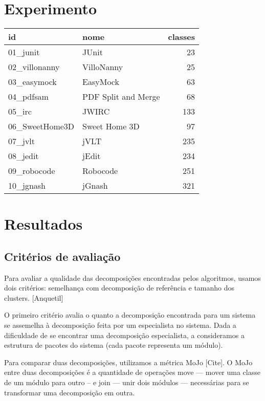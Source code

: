 
\section{Experimento}


\centering
\begin{tabular}{l l r}
\hline
id & nome & classes \\
\hline 
01\_junit       & JUnit               & 23  \\
02\_villonanny  & VilloNanny          & 25  \\
03\_easymock    & EasyMock            & 63  \\
04\_pdfsam      & PDF Split and Merge & 68  \\
05\_irc         & JWIRC               & 133 \\
06\_SweetHome3D & Sweet Home 3D       & 97  \\
07\_jvlt        & jVLT                & 235 \\
08\_jedit       & jEdit               & 234 \\
09\_robocode    & Robocode            & 251 \\
10\_jgnash      & jGnash              & 321 \\
\hline
\end{tabular}


\section{Resultados}

\subsection{Critérios de avaliação}
Para avaliar a qualidade das decomposições encontradas pelos algoritmos,
usamos dois critérios: semelhança com decomposição de referência e
tamanho dos clusters. [Anquetil]

O primeiro critério avalia o quanto a decomposição encontrada para um
sistema se assemelha à decomposição feita por um especialista no sistema.
Dada a dificuldade de se encontrar uma decomposição especialista, a
consideramos a estrutura de pacotes do sistema (cada pacote representa um 
módulo).

Para comparar duas decomposições, utilizamos a métrica MoJo [Cite].
O MoJo entre 
duas decomposições é a quantidade de operações move --- mover uma classe
de um módulo para outro -- e join --- unir dois módulos --- necessárias
para se transformar uma decomposição em outra.

